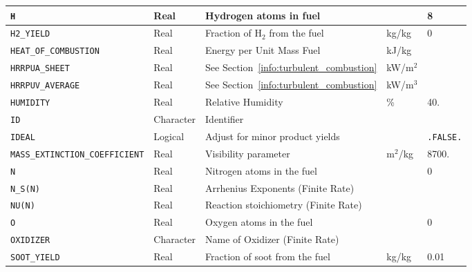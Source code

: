 \documentclass[11pt]{book}
\newcommand{\ct}{\tt\small}
\begin{document}
\begin{longtable}{@{\extracolsep{\fill}}|l|l|l|l|l|}
{\ct H}                                   & Real        & Hydrogen atoms in fuel                        &                   & 8    \\ \hline
{\ct H2\_YIELD}                           & Real        & Fraction of H$_2$ from the fuel               & kg/kg             & 0        \\ \hline
{\ct HEAT\_OF\_COMBUSTION}                & Real        & Energy per Unit Mass Fuel                     & kJ/kg             &         \\ \hline
{\ct HRRPUA\_SHEET}                       & Real        & See Section~\ref{info:turbulent_combustion}   & kW/m$^2$          &         \\ \hline
{\ct HRRPUV\_AVERAGE}                     & Real        & See Section~\ref{info:turbulent_combustion}   & kW/m$^3$          &         \\ \hline
{\ct HUMIDITY}                            & Real        & Relative Humidity                             & \%                & 40.               \\ \hline
{\ct ID}                                  & Character   & Identifier                                    &                   &     \\ \hline
{\ct IDEAL}                               & Logical     & Adjust for minor product yields               &                   & {\ct .FALSE.}    \\ \hline
{\ct \tiny MASS\_EXTINCTION\_COEFFICIENT} & Real        & Visibility parameter                          &  m$^2$/kg         & 8700.    \\ \hline
{\ct N}                                   & Real        & Nitrogen atoms in the fuel                    &                   & 0    \\ \hline
{\ct N\_S(N)}                             & Real        & Arrhenius Exponents (Finite Rate)             &                   &     \\ \hline
{\ct NU(N)}                               & Real        & Reaction stoichiometry (Finite Rate)          &                   &     \\ \hline
{\ct O}                                   & Real        & Oxygen atoms in the fuel                      &                   & 0    \\ \hline
{\ct OXIDIZER}                            & Character   & Name of Oxidizer (Finite Rate)                &                   &         \\ \hline
{\ct SOOT\_YIELD}                         & Real        & Fraction of soot from the fuel                & kg/kg             & 0.01    \\ \hline

\end{longtable}
\end{document}
